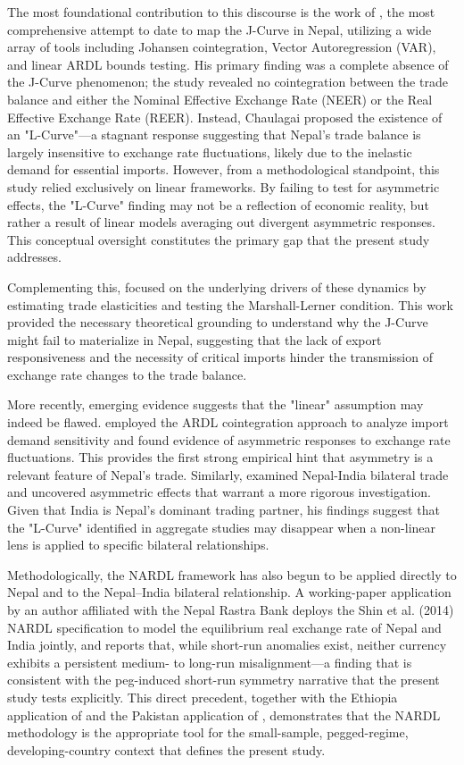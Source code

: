 \documentclass[12pt]{article}
\begin{document}
The most foundational contribution to this discourse is the work of \textcite{chaulagai2015}, the most comprehensive attempt to date to map the J-Curve in Nepal, utilizing a wide array of tools including Johansen cointegration, Vector Autoregression (VAR), and linear ARDL bounds testing. His primary finding was a complete absence of the J-Curve phenomenon; the study revealed no cointegration between the trade balance and either the Nominal Effective Exchange Rate (NEER) or the Real Effective Exchange Rate (REER). Instead, Chaulagai proposed the existence of an "L-Curve"—a stagnant response suggesting that Nepal’s trade balance is largely insensitive to exchange rate fluctuations, likely due to the inelastic demand for essential imports. However, from a methodological standpoint, this study relied exclusively on linear frameworks. By failing to test for asymmetric effects, the "L-Curve" finding may not be a reflection of economic reality, but rather a result of linear models averaging out divergent asymmetric responses. This conceptual oversight constitutes the primary gap that the present study addresses.

Complementing this, \textcite{pathak2020} focused on the underlying drivers of these dynamics by estimating trade elasticities and testing the Marshall-Lerner condition. This work provided the necessary theoretical grounding to understand why the J-Curve might fail to materialize in Nepal, suggesting that the lack of export responsiveness and the necessity of critical imports hinder the transmission of exchange rate changes to the trade balance.

More recently, emerging evidence suggests that the "linear" assumption may indeed be flawed. \textcite{Bishwakarma2024-fa} employed the ARDL cointegration approach to analyze import demand sensitivity and found evidence of asymmetric responses to exchange rate fluctuations. This provides the first strong empirical hint that asymmetry is a relevant feature of Nepal's trade. Similarly, \textcite{Adhikari2020-rr} examined Nepal-India bilateral trade and uncovered asymmetric effects that warrant a more rigorous investigation. Given that India is Nepal's dominant trading partner, his findings suggest that the "L-Curve" identified in aggregate studies may disappear when a non-linear lens is applied to specific bilateral relationships.

Methodologically, the NARDL framework has also begun to be applied directly to Nepal and to the Nepal--India bilateral relationship. A working-paper application by an author affiliated with the Nepal Rastra Bank deploys the Shin et al. (2014) NARDL specification to model the equilibrium real exchange rate of Nepal and India jointly, and reports that, while short-run anomalies exist, neither currency exhibits a persistent medium- to long-run misalignment---a finding that is consistent with the peg-induced short-run symmetry narrative that the present study tests explicitly. This direct precedent, together with the Ethiopia application of \textcite{Abegaz2024-wp} and the Pakistan application of \textcite{Iqbal2021-pu}, demonstrates that the NARDL methodology is the appropriate tool for the small-sample, pegged-regime, developing-country context that defines the present study.
\end{document}

